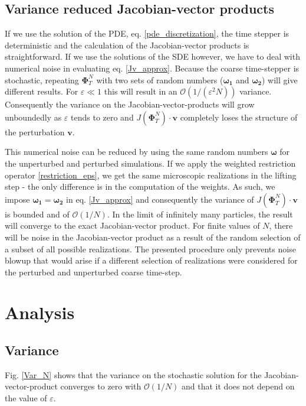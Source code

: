 \documentclass[]{article}
\newcommand{\cts}{\ensuremath{\boldsymbol{\Phi}^N_T}} %
\newcommand{\V}{\ensuremath{\mathbf{v}}}
\theoremstyle{definition}
\begin{document}


\subsection{Variance reduced Jacobian-vector products}

If we use the solution of the PDE, eq. \eqref{pde_discretization}, the time stepper is deterministic and the calculation of the Jacobian-vector products is straightforward. If we use the solutions of the SDE however, we have to deal with numerical noise in evaluating eq. \ref{Jv_approx}.
Because the coarse time-stepper is stochastic, repeating $\cts$ with two sets of random numbers ($\boldsymbol{\omega_1}$ and $ \boldsymbol{\omega_2}$)  will give different results. For $ \varepsilon \ll 1$ this will result in an $\mathcal{O}(1/(\varepsilon^2 N))$ variance. Consequently the variance on the Jacobian-vector-products will grow unboundedly as $\varepsilon$ tends to zero and $J(\cts) \cdot \mathbf{v}$ completely loses the structure of the perturbation \V.

This numerical noise can be reduced by using the same random numbers $\boldsymbol{\omega}$ for the unperturbed and perturbed simulations. If we apply the weighted restriction operator \eqref{restriction_eps},  we get the same microscopic realizations in the lifting step - the only difference is in the computation of the weights. As such,  we impose $\boldsymbol{\omega_1} = \boldsymbol{\omega_2}$ in eq. \eqref{Jv_approx} and consequently the variance of $J(\cts) \cdot \mathbf{v}$ is bounded and of  $\mathcal{O}(1/ N)$.  In the limit of infinitely many particles, the result will converge to the exact Jacobian-vector product. For finite values of $N$, there will be noise in the Jacobian-vector product as a result of the random selection of a subset of all possible realizations. The presented procedure only prevents noise blowup that would arise if a different selection of realizations were considered for the perturbed and unperturbed coarse time-step.


\section{Analysis}
\subsection{Variance}

Fig. \ref{Var_N} shows that the variance on the stochastic solution for the Jacobian-vector-product converges to zero with $\mathcal{O}(1/ N)$ and that it does not depend on the value of $\varepsilon$.
\end{document}
